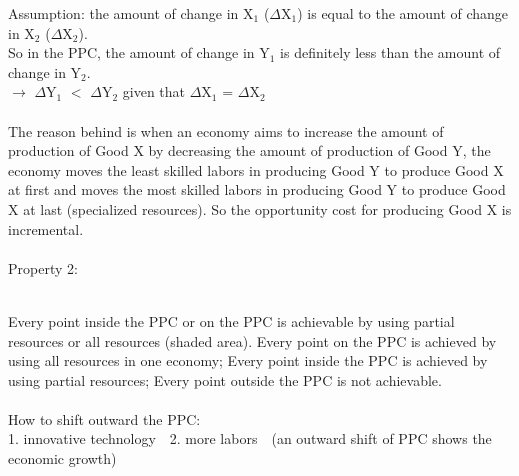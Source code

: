 \documentclass[UTF8]{article}
\begin{document}
\noindent
Assumption: the amount of change in X$_1$ ($\Delta$X$_1$) is equal to the amount of change in X$_2$ ($\Delta$X$_2$).\\
So in the PPC, the amount of change in Y$_1$ is definitely less than the amount of change in Y$_2$.\\
$\longrightarrow$ $\Delta$Y$_1$ $<$ $\Delta$Y$_2$ given that $\Delta$X$_1$ = $\Delta$X$_2$\\
\\
The reason behind is when an economy aims to increase the amount of production of Good X by decreasing the amount of production of Good Y, the economy moves the least skilled labors in producing Good Y to produce Good X at first and moves the most skilled labors in producing Good Y to produce Good X at last (specialized resources). So the opportunity cost for producing Good X is incremental.\\
\\
\newpage
\noindent
Property 2:
\begin{figure}[!htbp]
\end{figure}
\\
\noindent
Every point inside the PPC or on the PPC is achievable by using partial resources or all resources (shaded area). Every point on the PPC is achieved by using all resources in one economy; Every point inside the PPC is achieved by using partial resources; Every point outside the PPC is not achievable.\\
\\
How to shift outward the PPC:\\
1. innovative technology\ \  2. more labors\ \  (an outward shift of PPC shows the economic growth)\\
\\
\end{document}
